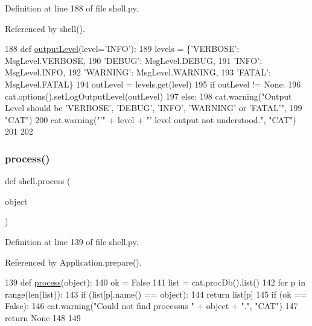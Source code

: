 Definition at line 188 of file shell.\+py.



Referenced by shell().


\begin{DoxyCode}
188 \textcolor{keyword}{def }\hyperlink{namespaceshell_ae17d022e61c0f8d61c3dee4f9bc68f51}{outputLevel}(level='INFO'):
189   levels = \{\textcolor{stringliteral}{'VERBOSE'}: MsgLevel.VERBOSE,
190             \textcolor{stringliteral}{'DEBUG'}: MsgLevel.DEBUG,
191             \textcolor{stringliteral}{'INFO'}: MsgLevel.INFO,
192             \textcolor{stringliteral}{'WARNING'}: MsgLevel.WARNING,
193             \textcolor{stringliteral}{'FATAL'}: MsgLevel.FATAL\}
194   outLevel = levels.get(level)
195   \textcolor{keywordflow}{if} outLevel != \textcolor{keywordtype}{None}:
196     cat.options().setLogOutputLevel(outLevel)
197   \textcolor{keywordflow}{else}:
198     cat.warning(\textcolor{stringliteral}{"Output Level should be 'VERBOSE', 'DEBUG', 'INFO', 'WARNING' or 'FATAL'"},
199                 \textcolor{stringliteral}{"CAT"})
200     cat.warning(\textcolor{stringliteral}{"'"} + level + \textcolor{stringliteral}{"' level output not understood."}, \textcolor{stringliteral}{"CAT"})
201 
202 
\end{DoxyCode}
\mbox{\label{namespaceshell_ae1ffb966b730c62592e1093acd8d9e29}} 
\subsubsection{\texorpdfstring{process()}{process()}}
{\footnotesize\ttfamily def shell.\+process (\begin{DoxyParamCaption}\item[{}]{object }\end{DoxyParamCaption})}



Definition at line 139 of file shell.\+py.



Referenced by Application.\+prepare().


\begin{DoxyCode}
139 \textcolor{keyword}{def }\hyperlink{namespaceshell_ae1ffb966b730c62592e1093acd8d9e29}{process}(object):
140   ok = \textcolor{keyword}{False}
141   list = cat.procDb().list()
142   \textcolor{keywordflow}{for} p \textcolor{keywordflow}{in} range(len(list)):
143     \textcolor{keywordflow}{if} (list[p].name() == object):
144       \textcolor{keywordflow}{return} list[p]
145   \textcolor{keywordflow}{if} (ok == \textcolor{keyword}{False}):
146     cat.warning(\textcolor{stringliteral}{"Could not find processus "} + object + \textcolor{stringliteral}{"."}, \textcolor{stringliteral}{"CAT"})
147     \textcolor{keywordflow}{return} \textcolor{keywordtype}{None}
148 
149 
\end{DoxyCode}
\mbox{\label{namespaceshell_af141a2fee68e5e84d8ac2cc51c3feedd}} 
